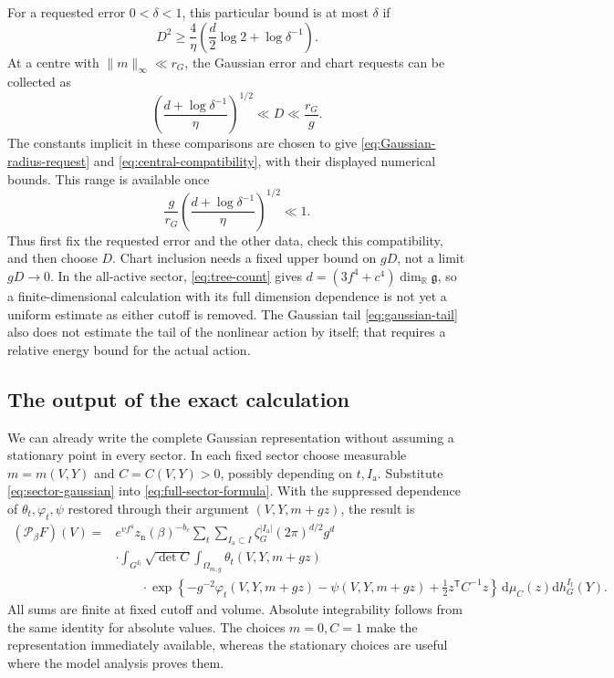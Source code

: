 \documentclass[11pt,reqno]{amsart}
\numberwithin{equation}{section}
\theoremstyle{definition}
\theoremstyle{remark}
\newcommand{\R}{\mathbb R}
\newcommand{\dd}{\mathrm d}
\newcommand{\g}{\mathfrak g}
\newcommand{\Ia}{I_{\mathrm a}}
\newcommand{\If}{I_{\mathrm f}}
\begin{document}
For a requested error \(0<\delta<1\), this particular bound is
at most \(\delta\) if
\begin{equation}
                D^2\ge\frac4\eta
                        \left(\frac d2\log2+\log\delta^{-1}\right).
 \label{eq:Gaussian-radius-request}
\end{equation}
At a centre with \(\|m\|_\infty\ll r_G\), the Gaussian
error and chart requests can be collected as
\[
 \left(\frac{d+\log\delta^{-1}}{\eta}\right)^{1/2}
                         \ll D\ll\frac{r_G}{g}.
\]
The constants implicit in these comparisons are chosen to
give \eqref{eq:Gaussian-radius-request} and
\eqref{eq:central-compatibility}, with their displayed
numerical bounds. This range is available once
\[
        \frac g{r_G}
          \left(\frac{d+\log\delta^{-1}}{\eta}\right)^{1/2}
                                                     \ll1.
\]
Thus first fix the requested error and the other data,
check this compatibility, and then choose \(D\).
Chart inclusion needs a fixed upper bound on \(gD\),
not a limit \(gD\to0\). In the all-active sector,
\eqref{eq:tree-count} gives
\(d=(3f^4+c^4)\dim_{\R}\g\), so a finite-dimensional calculation
with its full dimension dependence is not yet a uniform estimate
as either cutoff is removed. The Gaussian tail
\eqref{eq:gaussian-tail} also does not estimate the tail of the
nonlinear action by itself; that requires a relative energy bound
for the actual action.

\subsection{The output of the exact calculation}

We can already write the complete Gaussian representation without
assuming a stationary point in every sector. In each fixed sector
choose measurable \(m=m(V,Y)\) and \(C=C(V,Y)>0\), possibly
depending on \(t,\Ia\). Substitute \eqref{eq:sector-gaussian} into
\eqref{eq:full-sector-formula}. With the suppressed dependence of
\(\theta_t,\varphi_t,\psi\) restored through their argument
\((V,Y,m+gz)\), the result is
\begin{equation}
 \begin{split}
 (\mathcal P_\beta F)(V)
 ={}&e^{vf^4}z_{\mathrm n}(\beta)^{-b_c}
     \sum_t\sum_{\Ia\subset I}\zeta_G^{|\Ia|}(2\pi)^{d/2}g^d\\
 &\cdot\int_{G^{\If}}\sqrt{\det C}
       \int_{\Omega_{m,g}}\theta_t(V,Y,m+gz)\\
 &\qquad\cdot\exp\left\{-g^{-2}\varphi_t(V,Y,m+gz)
             -\psi(V,Y,m+gz)+\tfrac12z^{\mathsf T}C^{-1}z\right\}
                     \,\dd\mu_C(z)\dd h_G^{\If}(Y).
 \end{split}
 \label{eq:complete-Gaussian}
\end{equation}
All sums are finite at fixed cutoff and volume. Absolute
integrability follows from the same identity for absolute values.
The choices \(m=0,C=1\) make the representation immediately
available, whereas the stationary choices are useful where the
model analysis proves them.
\end{document}
